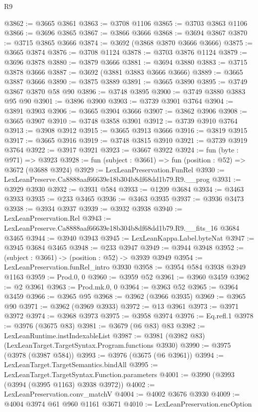 \begin{lexlean}{R9}
\begin{coremodule}
@3862 := @3665 @3861
@3863 := @3708 @1106
@3865 := @3703 @3863 @1106
@3866 := @3696 @3865
@3867 := @3866 @3666
@3868 := @3694 @3867
@3870 := @3715 @3865 @3666
@3874 := @3692 (@3868 @3870 @3666 @3666)
@3875 := @3665 @3874
@3876 := @3708 @1124
@3878 := @3703 @3876 @1124
@3879 := @3696 @3878
@3880 := @3879 @3666
@3881 := @3694 @3880
@3883 := @3715 @3878 @3666
@3887 := @3692 (@3881 @3883 @3666 @3666)
@3889 := @3665 @3887 @3666
@3890 := @3875 @3889
@3891 := @3665 @3890
@3895 := @3749 @3867 @3870 @58 @90
@3896 := @3748 @3895
@3900 := @3749 @3880 @3883 @95 @90
@3901 := @3896 @3900
@3903 := @3739 @3901 @3764
@3904 := @3891 @3903
@3906 := @3665 @3904 @3666
@3907 := @3862 @3906
@3908 := @3665 @3907
@3910 := @3748 @3858 @3901
@3912 := @3739 @3910 @3764
@3913 := @3908 @3912
@3915 := @3665 @3913 @3666
@3916 := @3819 @3915
@3917 := @3665 @3916
@3919 := @3748 @3815 @3910
@3921 := @3739 @3919 @3764
@3922 := @3917 @3921
@3923 := @3667 @3922
@3924 := fun (byte : @971) => @3923
@3928 := fun (subject : @3661) => fun (position : @52) => @3672 (@3688 @3924)
@3929 := LexLeanPreservation.FunRel
@3930 := LexLeanPreserve.Ca8888aaf66639e18b304b8df68dd1b79.R9.__prog
@3931 := @3929 @3930
@3932 := @3931 @584
@3933 := @1209 @3684
@3934 := @3463 @3933
@3935 := @233 @3465
@3936 := @3463 @3935
@3937 := @3936 @3473
@3938 := @3934 @3937
@3939 := @3932 @3938
@3940 := LexLeanPreservation.Rel
@3943 := LexLeanPreserve.Ca8888aaf66639e18b304b8df68dd1b79.R9.__fits_16 @3684 @3465
@3944 := @3940 @3943
@3945 := LexLeanKappa.Label.byteNat
@3947 := @3945 @3684 @3465
@3948 := @233 @3947
@3949 := @3944 @3948
@3952 := (subject : @3661) -> (position : @52) -> @3939 @3949
@3954 := LexLeanPreservation.funRel_intro @3930
@3958 := @3954 @584 @3938 @3949 @1163
@3959 := Prod.{0, 0}
@3960 := @3959 @52
@3961 := @3960 @3459
@3962 := @2 @3961
@3963 := Prod.mk.{0, 0}
@3964 := @3963 @52
@3965 := @3964 @3459
@3966 := @3965 @95
@3968 := @3962 (@3966 @3935)
@3969 := @3965 @90
@3971 := @3962 (@3969 @3933)
@3972 := @13 @3961
@3973 := @3971 @3972
@3974 := @3968 @3973
@3975 := @3958 @3974
@3976 := Eq.refl.{1}
@3978 := @3976 (@3675 @83)
@3981 := @3679 (@6 @83) @83
@3982 := LexLeanRuntime.instIndexableList
@3987 := @3981 (@3982 @83) (LexLeanTarget.TargetSyntax.Program.functions @3930)
@3990 := @3975 (@3978 (@3987 @584))
@3993 := @3976 (@3675 (@6 @3961))
@3994 := LexLeanTarget.TargetSemantics.bindAll
@3995 := LexLeanTarget.TargetSyntax.Function.parameters
@4001 := @3990 (@3993 (@3994 (@3995 @1163) @3938 @3972))
@4002 := LexLeanPreservation.conv_matchV
@4004 := @4002 @3676 @3930
@4009 := @4004 @3974 @61 @960 @1161 @3671
@4010 := LexLeanPreservation.encOption

\end{coremodule}
\end{lexlean}
